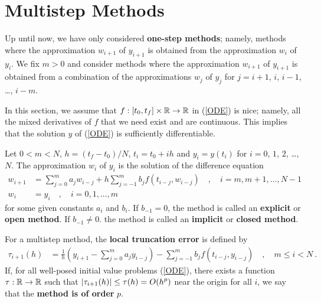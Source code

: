 \section{Multistep Methods}\label{SectMultMethod}

Up until now, we have only considered
{\bfseries one-step methods};
namely, methods where the approximation $w_{i+1}$ of $y_{i+1}$ is
obtained from the approximation $w_i$ of $y_i$.  We fix $m>0$ and
consider methods where the approximation $w_{i+1}$ of $y_{i+1}$ is
obtained from a combination of the approximations $w_j$ of $y_j$ for
$j=i+1$, $i$, $i-1$, \ldots, $i-m$.

In this section, we assume that $f:[t_0,t_f]\times \mathbb{R} \rightarrow \mathbb{R}$
in (\ref{ODE}) is nice; namely, all the mixed derivatives of $f$ that
we need exist and are continuous.  This implies that the solution $y$
of (\ref{ODE}) is sufficiently differentiable.

\begin{defn}
Let $0<m<N$, $h=(t_f-t_0)/N$, $t_i=t_0+ih$ and $y_i = y(t_i)$ for
$i=0$, $1$, $2$, \ldots, $N$.  The approximation $w_i$ of $y_i$ is the
solution of the difference equation
\begin{equation} \label{MULTISTEP}
\begin{split}
 w_{i+1} & = \sum_{j=0}^m a_j w_{i-j} + h
\sum_{j=-1}^m b_j f(t_{i-j},w_{i-j})
\quad, \quad i=m,m+1,\ldots,N-1 \\
w_i & = y_i \quad, \quad i=0,1,\ldots,m
\end{split}
\end{equation}
for some given constants $a_i$ and $b_i$.
If $b_{-1} = 0$, the method is called an
{\bfseries explicit} or
{\bfseries open method}.  If $b_{-1} \not=
0$. the method is called an
{\bfseries implicit} or
{\bfseries closed method}.
\label{GFMSM}
\end{defn}

\begin{defn}
For a multistep method, the
{\bfseries local truncation error} is defined by
\begin{align*}
\tau_{i+1}(h) &= \frac{1}{h}\left(y_{i+1} - \sum_{j=0}^ma_j y_{i-j} \right)
- \sum_{j=-1}^m b_j f(t_{i-j},y_{i-j}) \quad, \quad m \leq i < N \ .
\end{align*}
If, for all well-posed initial value problems (\ref{ODE}), there
exists a function $\tau:\mathbb{R}\to\mathbb{R}$ such that
$\displaystyle |\tau_{i+1}(h) | \leq \tau(h) = O(h^p)$ near the origin
for all $i$, we say that the
{\bfseries method is of order} $p$.
\label{local_trunc_error_def}
\end{defn}

